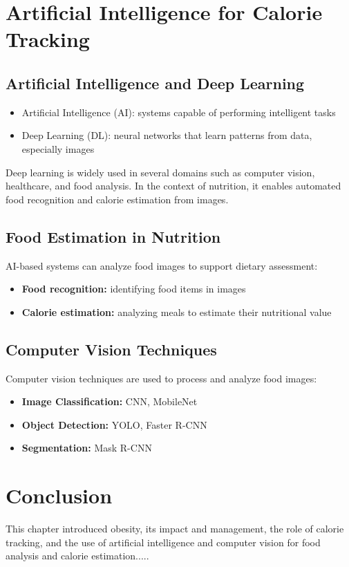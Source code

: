 \section{Artificial Intelligence for Calorie Tracking}

\subsection{Artificial Intelligence and Deep Learning}
\begin{itemize}
    \item Artificial Intelligence (AI): systems capable of performing intelligent tasks
    \item Deep Learning (DL): neural networks that learn patterns from data, especially images
\end{itemize}

Deep learning is widely used in several domains such as computer vision, healthcare, and food analysis. In the context of nutrition, it enables automated food recognition and calorie estimation from images.

\subsection{Food Estimation in Nutrition}
AI-based systems can analyze food images to support dietary assessment:
\begin{itemize}
    \item \textbf{Food recognition:} identifying food items in images
    \item \textbf{Calorie estimation:} analyzing meals to estimate their nutritional value
\end{itemize}

\subsection{Computer Vision Techniques}
Computer vision techniques are used to process and analyze food images:
\begin{itemize}
    \item \textbf{Image Classification:} CNN, MobileNet
    \item \textbf{Object Detection:} YOLO, Faster R-CNN
    \item \textbf{Segmentation:} Mask R-CNN
\end{itemize}

\section*{Conclusion}
This chapter introduced obesity, its impact and management, the role of calorie tracking, and the use of artificial intelligence and computer vision for food analysis and calorie estimation.....